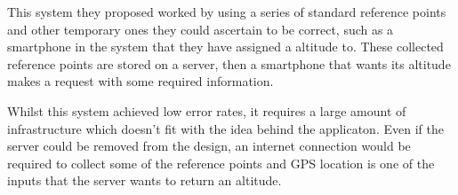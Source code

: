 \documentclass[main.tex]{subfiles}
\begin{document}
This system they proposed worked by using a series of standard reference points and other temporary ones they could ascertain to be correct, such as a smartphone in the system that they have assigned a altitude to. These collected reference points are stored on a server, then a smartphone that wants its altitude makes a request with some required information.

Whilst this system achieved low error rates, it requires a large amount of infrastructure which doesn't fit with the idea behind the applicaton. Even if the server could be removed from the design, an internet connection would be required to collect some of the reference points and GPS location is one of the inputs that the server wants to return an altitude.
\end{document}
